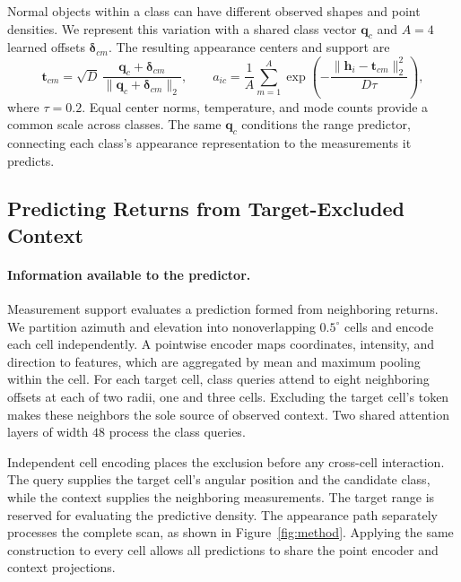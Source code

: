 \documentclass{article}
\begin{document}
Normal objects within a class can have different observed shapes and point densities. We represent this variation with a shared class vector $\mathbf q_c$ and $A=4$ learned offsets $\boldsymbol\delta_{cm}$. The resulting appearance centers and support are
\begin{equation}
 \mathbf t_{cm}=\sqrt D\,\frac{\mathbf q_c+\boldsymbol\delta_{cm}}
 {\|\mathbf q_c+\boldsymbol\delta_{cm}\|_2},\qquad
 a_{ic}=\frac{1}{A}\sum_{m=1}^{A}
 \exp\!\left(-\frac{\|\mathbf h_i-\mathbf t_{cm}\|_2^2}{D\tau}\right),
 \label{eq:appearance}
\end{equation}
where $\tau=0.2$. Equal center norms, temperature, and mode counts provide a common scale across classes. The same $\mathbf q_c$ conditions the range predictor, connecting each class's appearance representation to the measurements it predicts.

\subsection{Predicting Returns from Target-Excluded Context}
\label{sec:prediction}
\paragraph{Information available to the predictor.}
Measurement support evaluates a prediction formed from neighboring returns. We partition azimuth and elevation into nonoverlapping $0.5^\circ$ cells and encode each cell independently. A pointwise encoder maps coordinates, intensity, and direction to features, which are aggregated by mean and maximum pooling within the cell. For each target cell, class queries attend to eight neighboring offsets at each of two radii, one and three cells. Excluding the target cell's token makes these neighbors the sole source of observed context. Two shared attention layers of width $48$ process the class queries.

Independent cell encoding places the exclusion before any cross-cell interaction. The query supplies the target cell's angular position and the candidate class, while the context supplies the neighboring measurements. The target range is reserved for evaluating the predictive density. The appearance path separately processes the complete scan, as shown in Figure~\ref{fig:method}. Applying the same construction to every cell allows all predictions to share the point encoder and context projections.
\end{document}
